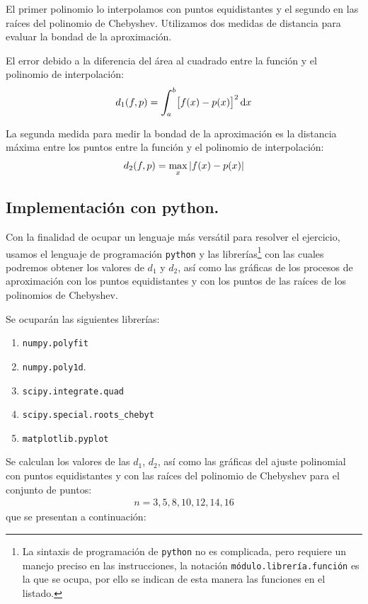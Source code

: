 \documentclass[12pt]{article}
\def\scaleint#1{\vcenter{\hbox{\scaleto[3ex]{\displaystyle\int}{#1}}}}
\def\bs{\mkern-12mu}
\numberwithin{equation}{section}
\begin{document}
El primer polinomio lo interpolamos con puntos equidistantes y el segundo en las raíces del polinomio de Chebyshev. Utilizamos dos medidas de distancia para evaluar la bondad de la aproximación.

El error debido a la diferencia del área al cuadrado entre la función y el polinomio de interpolación:
\begin{align*}
d_{1} (f, p) = \scaleint{6ex}_{\bs a}^{b} \big[ f(x) - p(x) \big]^{2} \dd{x}
\end{align*}

La segunda medida para medir la bondad de la aproximación es la distancia máxima entre los puntos entre la función y el polinomio de interpolación:
\begin{align*}
d_{2} (f, p) = \max_{x} \abs{f(x) - p(x)}
\end{align*}

\subsection{Implementación con python.}

Con la finalidad de ocupar un lenguaje más versátil para resolver el ejercicio, usamos el lenguaje de programación \texttt{python} y las librerías\footnote{La sintaxis de programación de \texttt{python} no es complicada, pero requiere un manejo preciso en las instrucciones, la notación \texttt{módulo.librería.función} es la que se ocupa, por ello se indican de esta manera las funciones en el listado.} con las cuales podremos obtener los valores de $d_{1}$ y $d_{2}$, así como las gráficas de los procesos de aproximación con los puntos equidistantes y con los puntos de las raíces de los polinomios de Chebyshev.
\par
Se ocuparán las siguientes librerías:
\begin{enumerate}[label=\alph*)]
\item \texttt{numpy.polyfit}
\item \texttt{numpy.poly1d}.
\item \texttt{scipy.integrate.quad}
\item \texttt{scipy.special.roots\_chebyt}
\item \texttt{matplotlib.pyplot}
\end{enumerate}

Se calculan los valores de las $d_{1}$, $d_{2}$, así como las gráficas del ajuste polinomial con puntos equidistantes y con las raíces del polinomio de Chebyshev para el conjunto de puntos:
\begin{align*}
n = 3, 5, 8, 10, 12, 14, 16
\end{align*}
que se presentan a continuación:
\end{document}
